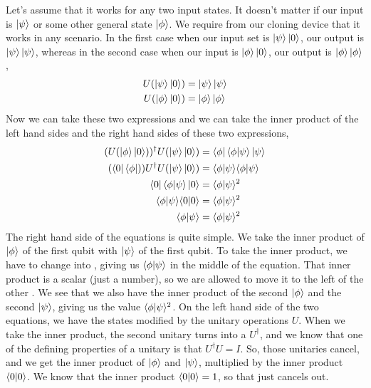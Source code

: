 Let's assume that it works for any two input states. It doesn't matter if our input is $\left| \psi \right\rangle$ or some other general state $\left| \phi \right\rangle$. We require from our cloning device that it works in any scenario. In the first case when our input set is $\left| \psi \right\rangle\left| 0 \right\rangle$, our output is $\left| \psi \right\rangle \left| \psi \right\rangle$, whereas in the second case when our input is $\left| \phi \right\rangle\left| 0 \right\rangle$, our output is $\left| \phi \right\rangle\left| \phi \right\rangle$,
\begin{equation}
\begin{aligned}
U(\left| \psi \right\rangle\left| 0 \right\rangle) &=\left| \psi \right\rangle\left| \psi \right\rangle \\
U(\left| \phi \right\rangle\left| 0 \right\rangle) &=\left| \phi \right\rangle\left| \phi \right\rangle
\end{aligned}
\end{equation}
Now we can take these two expressions and we can take the inner product of the left hand sides and the right hand sides of these two expressions,
\begin{equation}
\begin{aligned}
(U(\left| \phi \right\rangle\left| 0 \right\rangle))^{\dagger}U(\left| \psi \right\rangle\left| 0 \right\rangle) &= \left\langle \phi \right|\langle \phi|\psi \rangle\left| \psi \right\rangle \\
(\left\langle 0 \right|\left\langle \phi \right|))U^{\dagger}U(\left| \psi \right\rangle\left| 0 \right\rangle) &= \langle \phi|\psi \rangle\langle \phi|\psi \rangle \\
\left\langle 0 \right|\langle \phi|\psi \rangle\left| 0 \right\rangle &= \langle \phi|\psi \rangle^2\\
\langle \phi|\psi \rangle\langle 0|0 \rangle &= \langle \phi|\psi \rangle^2\\
\langle \phi|\psi \rangle &= \langle \phi|\psi \rangle^2
\end{aligned}
\end{equation}
The right hand side of the equations is quite simple. We take the inner product of $\left| \phi \right\rangle$ of the first qubit with $\left| \psi \right\rangle$ of the first qubit. To take the inner product, we have to change \ket{\phi} into \bra{\phi}, giving us $\langle \phi|\psi \rangle$ in the middle of the equation. That inner product is a scalar (just a number), so we are allowed to move it to the left of the other \ket{\phi}. We see that we also have the inner product of the second $\left| \phi \right\rangle$ and the second $\left| \psi \right\rangle$, giving us the value $\langle \phi|\psi \rangle^2$. On the left hand side of the two equations, we have the states modified by the unitary operations $U$.  When we take the inner product, the second unitary turns into a $U^\dagger$, and we know that one of the defining properties of a unitary is that $U^\dagger U = I$. So, those unitaries cancel, and we get the inner product of $\left| \phi \right\rangle$ and $\left| \psi \right\rangle$, multiplied by the inner product $\langle 0|0 \rangle$. We know that the inner product $\langle 0|0 \rangle = 1$, so that just cancels out.


